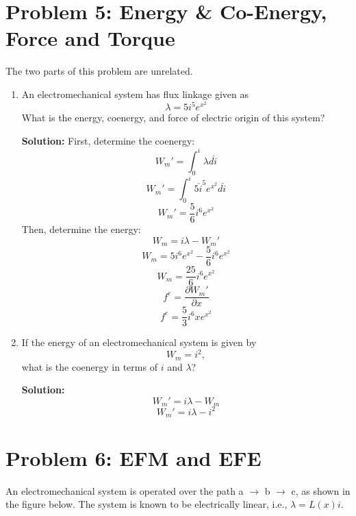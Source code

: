 \documentclass{article}
\begin{document}
\section*{Problem 5: Energy \& Co-Energy, Force and Torque} 
The two parts of this problem are unrelated.
\begin{enumerate}[label=(\alph*)]
    \item {An electromechanical system has flux linkage given as
    $$\lambda = 5i^5e^{x^2}$$
    What is the energy, coenergy, and force of electric origin of this system?}

\textbf{Solution:}
First, determine the coenergy:
$$W_m' = \int_0^{i}\lambda d\hat{i}$$
$$W_m' = \int_0^{i}5\hat{i}^5e^{x^2} d\hat{i}$$
$$\boxed{W_m' = \frac{5}{6}i^6e^{x^2}}$$
Then, determine the energy:
$$W_m = i\lambda - W_m'$$
$$W_m = 5i^6e^{x^2} - \frac{5}{6}i^6e^{x^2}$$
$$\boxed{W_m = \frac{25}{6}i^6e^{x^2}}$$
$$f^e = \frac{\partial W_m'}{\partial x}$$
$$\boxed{f^e = \frac{5}{3}i^6xe^{x^2}}$$
    \item {If the energy of an electromechanical system is given by $$W_m=i^2,$$ what is the coenergy in terms of $i$ and $\lambda$?}

\textbf{Solution:}
$$W_m' = i\lambda - W_m$$
$$\boxed{W_m' = i\lambda - i^2}$$
\end{enumerate}

\newpage %
\noindent 
\section*{Problem 6: EFM and EFE}  
An electromechanical system is operated over the path a $\rightarrow$ b $\rightarrow$ c, as shown in the figure below.  The system is known to be electrically linear, i.e., $\lambda=L(x)i$.
\end{document}
